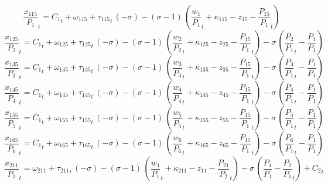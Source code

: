 \begin{dmath}
{{\frac{x_{115}}{P_{1}}}}_{t}={{C_{1}}}_{t}+{{\omega_{115}}}+{{\tau_{115}}}_{t}\, \left(-{{\sigma}}\right)-\left({{\sigma}}-1\right)\, \left({{\frac{w_{1}}{P_{1}}}}_{t}+{{\kappa_{115}}}-{{z_{15}}}-{{\frac{P_{15}}{P_{1}}}}_{t}\right)
\end{dmath}
\begin{dmath}
{{\frac{x_{125}}{P_{2}}}}_{t}={{C_{1}}}_{t}+{{\omega_{125}}}+{{\tau_{125}}}_{t}\, \left(-{{\sigma}}\right)-\left({{\sigma}}-1\right)\, \left({{\frac{w_{2}}{P_{2}}}}_{t}+{{\kappa_{125}}}-{{z_{25}}}-{{\frac{P_{15}}{P_{1}}}}_{t}\right)-{{\sigma}}\, \left({{\frac{P_{2}}{P_{1}}}}_{t}-{{\frac{P_{1}}{P_{1}}}}\right)
\end{dmath}
\begin{dmath}
{{\frac{x_{135}}{P_{3}}}}_{t}={{C_{1}}}_{t}+{{\omega_{135}}}+{{\tau_{135}}}_{t}\, \left(-{{\sigma}}\right)-\left({{\sigma}}-1\right)\, \left({{\frac{w_{3}}{P_{3}}}}_{t}+{{\kappa_{135}}}-{{z_{35}}}-{{\frac{P_{15}}{P_{1}}}}_{t}\right)-{{\sigma}}\, \left({{\frac{P_{3}}{P_{1}}}}_{t}-{{\frac{P_{1}}{P_{1}}}}\right)
\end{dmath}
\begin{dmath}
{{\frac{x_{145}}{P_{4}}}}_{t}={{C_{1}}}_{t}+{{\omega_{145}}}+{{\tau_{145}}}_{t}\, \left(-{{\sigma}}\right)-\left({{\sigma}}-1\right)\, \left({{\frac{w_{4}}{P_{4}}}}_{t}+{{\kappa_{145}}}-{{z_{45}}}-{{\frac{P_{15}}{P_{1}}}}_{t}\right)-{{\sigma}}\, \left({{\frac{P_{4}}{P_{1}}}}_{t}-{{\frac{P_{1}}{P_{1}}}}\right)
\end{dmath}
\begin{dmath}
{{\frac{x_{155}}{P_{5}}}}_{t}={{C_{1}}}_{t}+{{\omega_{155}}}+{{\tau_{155}}}_{t}\, \left(-{{\sigma}}\right)-\left({{\sigma}}-1\right)\, \left({{\frac{w_{5}}{P_{5}}}}_{t}+{{\kappa_{155}}}-{{z_{55}}}-{{\frac{P_{15}}{P_{1}}}}_{t}\right)-{{\sigma}}\, \left({{\frac{P_{5}}{P_{1}}}}_{t}-{{\frac{P_{1}}{P_{1}}}}\right)
\end{dmath}
\begin{dmath}
{{\frac{x_{165}}{P_{6}}}}_{t}={{C_{1}}}_{t}+{{\omega_{165}}}+{{\tau_{165}}}_{t}\, \left(-{{\sigma}}\right)-\left({{\sigma}}-1\right)\, \left({{\frac{w_{6}}{P_{6}}}}_{t}+{{\kappa_{165}}}-{{z_{65}}}-{{\frac{P_{15}}{P_{1}}}}_{t}\right)-{{\sigma}}\, \left({{\frac{P_{6}}{P_{1}}}}_{t}-{{\frac{P_{1}}{P_{1}}}}\right)
\end{dmath}
\begin{dmath}
{{\frac{x_{211}}{P_{1}}}}_{t}={{\omega_{211}}}+{{\tau_{211}}}_{t}\, \left(-{{\sigma}}\right)-\left({{\sigma}}-1\right)\, \left({{\frac{w_{1}}{P_{1}}}}_{t}+{{\kappa_{211}}}-{{z_{11}}}-{{\frac{P_{21}}{P_{2}}}}_{t}\right)-{{\sigma}}\, \left({{\frac{P_{1}}{P_{1}}}}-{{\frac{P_{2}}{P_{1}}}}_{t}\right)+{{C_{2}}}_{t}
\end{dmath}
